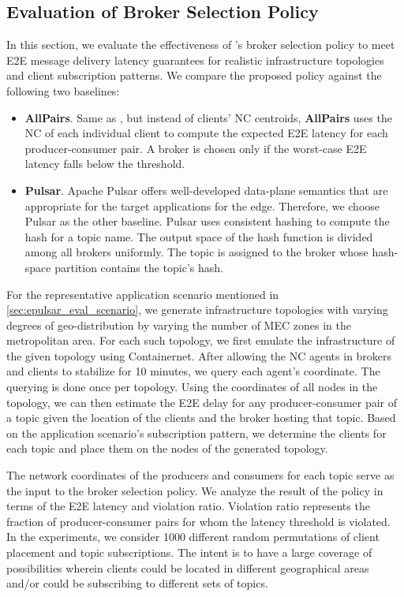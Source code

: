\subsection{Evaluation of Broker Selection Policy}
In this section, we evaluate the effectiveness of \epulsar{}'s broker selection policy to meet E2E message delivery latency guarantees for realistic infrastructure topologies and client subscription patterns. We compare the proposed policy against the following two baselines:
\begin{itemize}
\item \textbf{AllPairs}. Same as \epulsar, but instead of clients' NC  centroids, \textbf{AllPairs} uses the NC of each individual client to compute the expected E2E latency for each producer-consumer pair. A broker is chosen only if the worst-case E2E latency falls below the threshold.
\item \textbf{Pulsar}. Apache Pulsar offers well-developed data-plane semantics that are appropriate for the target applications for the edge. Therefore, we choose Pulsar as the other baseline. Pulsar uses consistent hashing to compute the hash for a topic name. The output space of the hash function is divided among all brokers uniformly. The topic is assigned to the broker whose hash-space partition contains the topic's hash.
\end{itemize}

For the representative application scenario mentioned in \cref{sec:epulsar_eval_scenario}, we generate infrastructure topologies with varying degrees of geo-distribution by varying the number of MEC zones in the metropolitan area. For each such topology, we first emulate the infrastructure of the given topology using Containernet. After allowing the NC agents in brokers and clients to stabilize for 10 minutes, we query each agent's coordinate. The querying is done once per topology. Using the coordinates of all nodes in the topology, we can then estimate the E2E delay for any producer-consumer pair of a topic given the location of the clients and the broker hosting that topic. Based on the application scenario's subscription pattern, we determine the clients for each topic and place them on the nodes of the generated topology. 

The network coordinates of the producers and consumers for each topic serve as the input to the broker selection policy. We analyze the result of the policy in terms of the E2E latency and violation ratio. Violation ratio represents the fraction of producer-consumer pairs for whom the latency threshold is violated. In the experiments, we consider 1000 different random permutations of client placement and topic subscriptions.  The intent is to have a large coverage of possibilities wherein clients could be located in different geographical areas and/or could be subscribing to different sets of topics.

